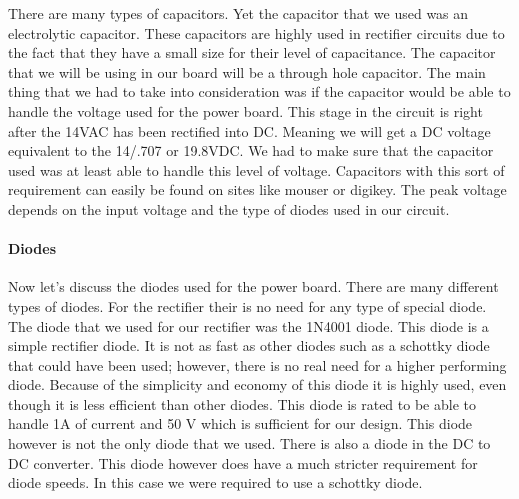 There are many types of capacitors. Yet the capacitor that we used was an electrolytic capacitor. These capacitors are highly used in
rectifier circuits due to the fact that they have a small size for their level
of capacitance.\cite{link6} 
The capacitor
that we will be using in our board will be a through hole capacitor. The
main thing that we had to take into consideration was if the capacitor would be
able to handle the voltage used for the power board. This stage in the circuit
is right after the 14VAC has been rectified into DC. Meaning we will get a DC
voltage equivalent to the 14/.707 or 19.8VDC. We had to make sure that the
capacitor used was at least able to handle this level of voltage.
Capacitors with this sort of requirement can easily be found on sites like
mouser or digikey. The peak voltage depends on the input
voltage and the type of diodes used in our circuit.

\paragraph{Diodes}

Now let{}'s discuss the diodes used for the power board. There are many
different types of diodes. For the rectifier their is no need for any type of
special diode. The diode that we used for our rectifier was the
1N4001 diode. This diode is a simple rectifier diode. It is not as fast as
other diodes such as a schottky diode that could have been used; however, there
is no real need for a higher performing diode. Because of the simplicity and
economy of this diode it is highly used, even though it is less efficient than
other diodes. This diode is rated to be able to handle 1A of current and 50 V
which is sufficient for our design. This diode however is not the only diode
that we used. There is also a diode in the DC to DC converter. This diode however does have a much
stricter requirement for diode speeds. In this case we were required to use
a schottky diode.
\cite{link7}

